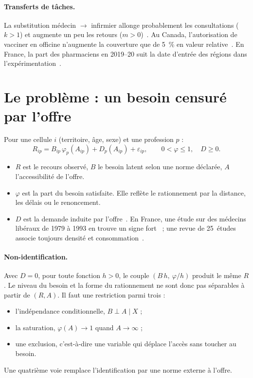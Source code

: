 \documentclass[11pt]{article}
\begin{document}
\paragraph{Transferts de tâches.} La substitution médecin $\to$ infirmier allonge probablement les consultations
($k>1$) et augmente un peu les retours ($m>0$)~\citep{laurant2018}. Au Canada, l'autorisation de vacciner en officine
n'augmente la couverture que de 5~\% en valeur relative~\citep{buchan2017}. En France, la part des pharmaciens en
2019--20 suit la date d'entrée des régions dans l'expérimentation~\citep{liard2022}.

\section{Le problème : un besoin censuré par l'offre}\label{sec:probleme}
Pour une cellule $i$ (territoire, âge, sexe) et une profession $p$ :
\[
R_{ip} = B_{ip}\,\varphi_p(A_{ip}) + D_p(A_{ip}) + \varepsilon_{ip},\qquad 0<\varphi\le 1,\quad D\ge 0 .
\]
\begin{itemize}
  \item $R$ est le recours observé, $B$ le besoin latent selon une norme déclarée, $A$ l'accessibilité de l'offre.
  \item $\varphi$ est la part du besoin satisfaite. Elle reflète le rationnement par la distance, les délais ou le
        renoncement.
  \item $D$ est la demande induite par l'offre~\citep{evans1974}. En France, une étude sur des médecins libéraux de
        1979 à 1993 en trouve un signe fort~\citep{delattre2003} ; une revue de 25~études associe toujours densité et
        consommation~\citep{leonard2009}.
\end{itemize}

\paragraph{Non-identification.} Avec $D=0$, pour toute fonction $h>0$, le couple $(B\,h,\ \varphi/h)$ produit le même
$R$\derive{}. Le niveau du besoin et la forme du rationnement ne sont donc pas séparables à partir de $(R,A)$. Il faut
une restriction parmi trois :
\begin{itemize}
  \item l'indépendance conditionnelle, $B\perp A\mid X$ ;
  \item la saturation, $\varphi(A)\to1$ quand $A\to\infty$ ;
  \item une exclusion, c'est-à-dire une variable qui déplace l'accès sans toucher au besoin.
\end{itemize}
Une quatrième voie remplace l'identification par une norme externe à l'offre.
\end{document}
